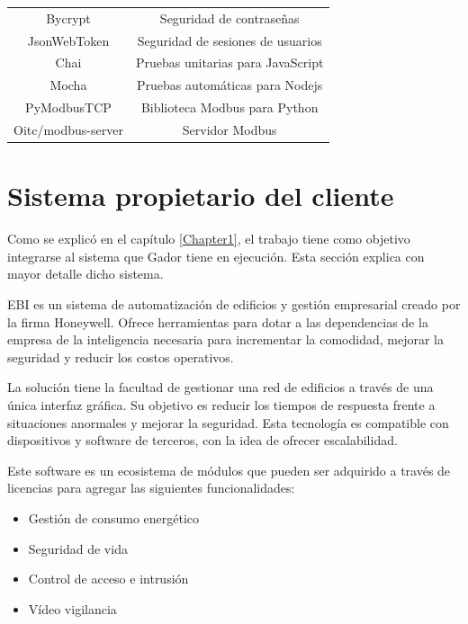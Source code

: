 \begin{table}[h]
\begin{tabular}{c c}
		Bycrypt            & Seguridad de contraseñas                  \\
		JsonWebToken       & Seguridad de sesiones de usuarios         \\
		Chai               & Pruebas unitarias para JavaScript         \\
		Mocha              & Pruebas automáticas para Nodejs           \\
		PyModbusTCP        & Biblioteca Modbus para Python             \\
		Oitc/modbus-server & Servidor Modbus                           \\
		\bottomrule
		\hline
	\end{tabular}
\end{table}

\section{Sistema propietario del cliente}

Como se explicó en el capítulo \ref{Chapter1}, el trabajo tiene como objetivo integrarse al sistema que Gador tiene en ejecución.
Esta sección explica con mayor detalle dicho sistema.

EBI es un sistema de automatización de edificios y gestión empresarial creado por la firma Honeywell.
Ofrece herramientas para dotar a las dependencias de la empresa de la inteligencia necesaria para incrementar la comodidad, mejorar la seguridad y reducir los costos operativos.

La solución tiene la facultad de gestionar una red de edificios a través de una única interfaz gráfica.
Su objetivo es reducir los tiempos de respuesta frente a situaciones anormales y mejorar la seguridad.
Esta tecnología es compatible con dispositivos y software de terceros, con la idea de ofrecer escalabilidad.

Este software es un ecosistema de módulos que pueden ser adquirido a través de licencias para agregar las siguientes funcionalidades:

\begin{itemize}
	\item Gestión de consumo energético
	\item Seguridad de vida
	\item Control de acceso e intrusión
	\item Vídeo vigilancia
\end{itemize}

